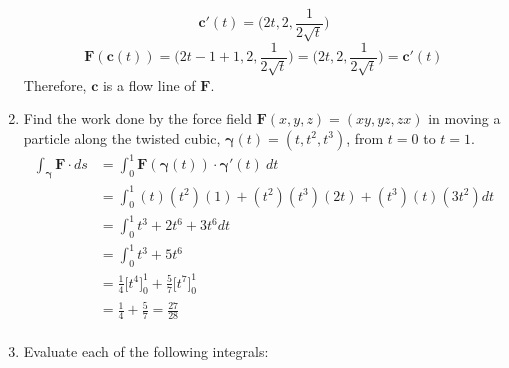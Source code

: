 \documentclass{article}
\newcommand{\gam}{\boldsymbol{\gamma}}
\begin{document}
\begin{enumerate}
        \[\boldsymbol{c}'(t) = \Big(2t, 2, \frac{1}{2\sqrt{t}}\Big) \]
        \[ \boldsymbol{F}(\boldsymbol{c}(t)) = \Big(2t - 1 + 1, 2, \frac{1}{2\sqrt{t}}\Big) = \Big(2t, 2, \frac{1}{2\sqrt{t}}\Big) = \boldsymbol{c}'(t) \]
        Therefore, $\boldsymbol{c}$ is a flow line of $\boldsymbol{F}$.

    \newpage
    \item Find the work done by the force field $\boldsymbol{F}(x,y,z) = (xy,yz,zx)$ in moving a particle along the twisted cubic, $\gam(t) = (t,t^2,t^3)$, from $t=0$ to $t=1$.
        \begin{align*}
            \int_{\gam} \boldsymbol{F} \cdot ds &= \int_0^1 \boldsymbol{F}(\gam(t)) \cdot \gam'(t) \ dt \\
            &= \int_0^1 (t)(t^2)(1) + (t^2)(t^3)(2t) + (t^3)(t)(3t^2)dt \\
            &= \int_0^1 t^3 + 2t^6 + 3t^6 dt\\
            &= \int_0^1 t^3 + 5t^6 \\
            &= \frac{1}{4}\Big[t^4\Big]_0^1 + \frac{5}{7}\Big[t^7\Big]_0^1\\
            &= \frac{1}{4} + \frac{5}{7} = \frac{27}{28} \\
        \end{align*}
    \newpage
    \item Evaluate each of the following integrals:
\end{enumerate}
\end{document}
